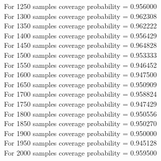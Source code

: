 \documentclass{article}
\begin{document}
For 1250 samples coverage probability = 0.956000\\
For 1300 samples coverage probability = 0.962308\\
For 1350 samples coverage probability = 0.962222\\
For 1400 samples coverage probability = 0.956429\\
For 1450 samples coverage probability = 0.964828\\
For 1500 samples coverage probability = 0.953333\\
For 1550 samples coverage probability = 0.946452\\
For 1600 samples coverage probability = 0.947500\\
For 1650 samples coverage probability = 0.950909\\
For 1700 samples coverage probability = 0.958824\\
For 1750 samples coverage probability = 0.947429\\
For 1800 samples coverage probability = 0.950556\\
For 1850 samples coverage probability = 0.950270\\
For 1900 samples coverage probability = 0.950000\\
For 1950 samples coverage probability = 0.945128\\
For 2000 samples coverage probability = 0.959500\\
\end{document}
